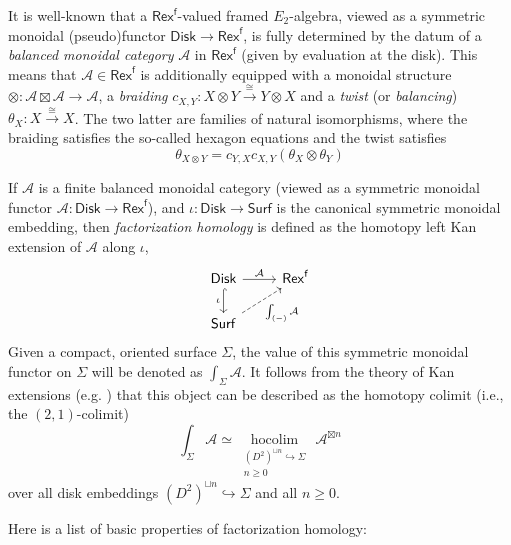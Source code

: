 \documentclass[11pt]{article}
\theoremstyle{definition}
\begin{document}
It is well-known that a $\mathsf{Rex}^\mathsf{f}$-valued framed $E_2$-algebra, viewed as a symmetric monoidal (pseudo)functor $\mathsf{Disk} \longrightarrow \mathsf{Rex}^\mathsf{f}$, is fully determined by the datum of a  \emph{balanced monoidal category} $\mathcal{A}$ in $\mathsf{Rex}^\mathsf{f}$ (given by evaluation at the disk). This means that $\mathcal{A} \in \mathsf{Rex}^\mathsf{f}$ is additionally equipped with a monoidal structure $\otimes: \mathcal{A} \boxtimes \mathcal{A} \longrightarrow \mathcal{A}$, a \emph{braiding} $c_{X,Y}: X \otimes Y \overset{\cong}{\longrightarrow} Y \otimes X$ and a \emph{twist} (or \emph{balancing}) $\theta_X: X \overset{\cong}{\longrightarrow} X$.  The two latter are families of natural isomorphisms, where the braiding satisfies the so-called hexagon equations and the twist satisfies
$$ \theta_{X \otimes Y} = c_{Y,X}c_{X,Y}(\theta_X \otimes \theta_Y)    $$

If $\mathcal{A}$ is a finite balanced monoidal category (viewed as a symmetric monoidal functor $\mathcal{A}: \mathsf{Disk} \longrightarrow \mathsf{Rex}^\mathsf{f}$), and $\iota: \mathsf{Disk} \longrightarrow \mathsf{Surf}$ is the canonical symmetric  monoidal embedding, then \emph{factorization homology} is defined as the homotopy left Kan extension of $\mathcal{A}$ along $\iota$,
\begin{equation}
\begin{tikzcd}
\mathsf{Disk} \rar{\mathcal{A}} \arrow[hook]{d}[swap]{\iota} & \mathsf{Rex}^\mathsf{f} \\
\mathsf{Surf}  \arrow[dashed]{ur}[swap]{\int_{(-)} \mathcal{A}}  &
\end{tikzcd}
\end{equation}
Given a compact, oriented surface $\Sigma$, the value of this symmetric monoidal functor on $\Sigma $ will be denoted as $\int_\Sigma \mathcal{A}$. It follows from the theory of Kan extensions (e.g. \cite[Theorem 6.2.1]{riehlcat}) that this object can be described as the homotopy colimit (i.e., the $(2,1)$-colimit)
\begin{equation}
\int_\Sigma \mathcal{A} \simeq \underset{\substack{
 ( D^2)^{\sqcup n} \hookrightarrow \Sigma   \\ n\ge 0}}{\operatorname{hocolim}}\, \mathcal{A}^{\boxtimes n}
\end{equation}
over all disk embeddings $( D^2)^{\sqcup n} \hookrightarrow \Sigma $ and all $n\ge 0$.

Here is a list of basic properties of factorization homology:
\end{document}
